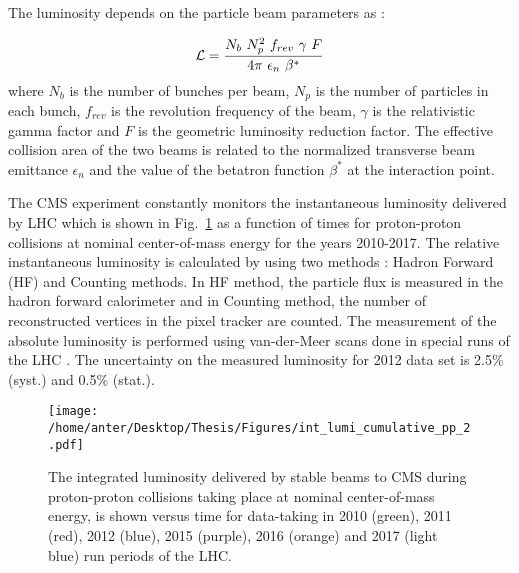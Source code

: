 The luminosity depends on the particle beam parameters as :

\begin{equation}
\lumi = \frac{N_b~N^2_p~f_{rev}~\gamma~F}{4\pi~\epsilon_n~\beta^*}
\end{equation}
where $N_b$ is the number of bunches per beam, $N_p$ is the number of particles in each bunch, $f_{rev}$ is the revolution frequency of the beam, $\gamma$ is the relativistic gamma factor and $F$ is the geometric luminosity reduction factor. The effective collision area of the two beams is related to the normalized transverse beam emittance $\epsilon_n$ and the value of the betatron function $ \beta^*$ at the interaction point.
 
The CMS experiment constantly monitors the instantaneous luminosity delivered by LHC which is shown in Fig.~\ref{fig:lumi} as a function of times for proton-proton collisions at nominal center-of-mass energy for the years 2010-2017. The relative instantaneous luminosity is calculated by using two methods \cite{CMS:2013gfa} : Hadron Forward (HF) and Counting methods. In HF method, the particle flux is measured in the hadron forward calorimeter and in Counting method, the number of reconstructed vertices in the pixel tracker are counted. The measurement of the absolute luminosity is performed using van-der-Meer scans done in special runs of the LHC \cite{vanderMeer:1968zz}. The uncertainty on the measured luminosity for 2012 data set is 2.5\% (syst.) and 0.5\% (stat.).

\begin{figure}[!h]
 \begin{center}
 \vspace*{4mm} 
 \texttt{[image: /home/anter/Desktop/Thesis/Figures/int\_lumi\_cumulative\_pp\_2.pdf]}\\
 \vspace*{5mm}
 \caption[The integrated luminosity delivered by stable beams to CMS during proton-proton collisions.]{The integrated luminosity delivered by stable beams to CMS during proton-proton collisions taking place at nominal center-of-mass energy, is shown versus time for data-taking in 2010 (green), 2011 (red), 2012 (blue), 2015 (purple), 2016 (orange) and 2017 (light blue) run periods of the LHC\footnotemark.}
 \label{fig:lumi}
 \end{center}
\end{figure}
